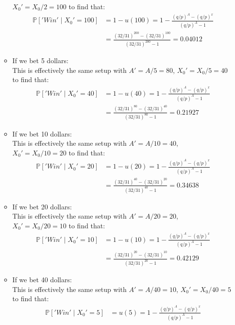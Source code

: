 \documentclass[12pt,twoside, letter]{exam}
\theoremstyle{definition}
\newcommand{\pp}{\mathbb{P}}
\begin{document}
\begin{itemize}
\begin{solution}
\begin{itemize}
            $X_0'= X_0/2 = 100$ to find that:
            \begin{align*}
              \pp['Win' \mid X_0' = 100] &= 1 - u(100) = 1 - \frac{(q/p)^A - (q/p)^x}{(q/p)^A-1} \\
              &= \frac{(32/31)^{200} - (32/31)^{100}}{(32/31)^{200}-1} = 0.04012
            \end{align*}
          \item If we bet 5 dollars: \\
            This is effectively the same setup with $A' = A/5 = 80$,
            $X_0'= X_0/5 = 40$ to find that:
            \begin{align*}
              \pp['Win' \mid X_0' = 40] &= 1 - u(40) = 1 - \frac{(q/p)^A - (q/p)^x}{(q/p)^A-1} \\
              &= \frac{(32/31)^{80} - (32/31)^{40}}{(32/31)^{80}-1} = 0.21927
            \end{align*}
            \item If we bet 10 dollars: \\
              This is effectively the same setup with $A' = A/10 = 40$,
              $X_0'= X_0/10 = 20$ to find that:
              \begin{align*}
                \pp['Win' \mid X_0' = 20] &= 1 - u(20) = 1 - \frac{(q/p)^A - (q/p)^x}{(q/p)^A-1} \\
                &= \frac{(32/31)^{40} - (32/31)^{20}}{(32/31)^{40}-1} = 0.34638
              \end{align*}
            \item If we bet 20 dollars: \\
              This is effectively the same setup with $A' = A/20 = 20$,
              $X_0'= X_0/20 = 10$ to find that:
              \begin{align*}
                \pp['Win' \mid X_0' = 10] &= 1 - u(10) = 1 - \frac{(q/p)^A - (q/p)^x}{(q/p)^A-1} \\
                &= \frac{(32/31)^{20} - (32/31)^{10}}{(32/31)^{20}-1} = 0.42129
              \end{align*}
            \item If we bet 40 dollars: \\
              This is effectively the same setup with $A' = A/40 = 10$,
              $X_0'= X_0/40 = 5$ to find that:
              \begin{align*}
                \pp['Win' \mid X_0' = 5]& = u(5) = 1 - \frac{(q/p)^A - (q/p)^x}{(q/p)^A-1} \\

\end{align*}
\end{itemize}
\end{solution}
\end{itemize}
\end{document}
